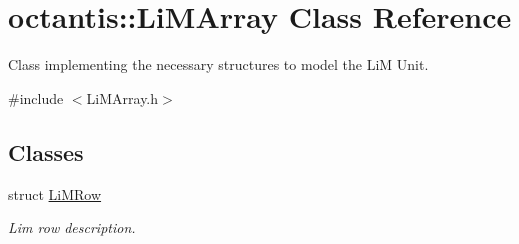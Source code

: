 \hypertarget{classoctantis_1_1LiMArray}{}\section{octantis\+:\+:Li\+M\+Array Class Reference}
\label{classoctantis_1_1LiMArray}


Class implementing the necessary structures to model the LiM Unit.  




{\ttfamily \#include $<$Li\+M\+Array.\+h$>$}

\subsection*{Classes}
\begin{DoxyCompactItemize}
\item 
struct \hyperlink{structoctantis_1_1LiMArray_1_1LiMRow}{Li\+M\+Row}
\begin{DoxyCompactList}\small\item\em Lim row description. \end{DoxyCompactList}\end{DoxyCompactItemize}
